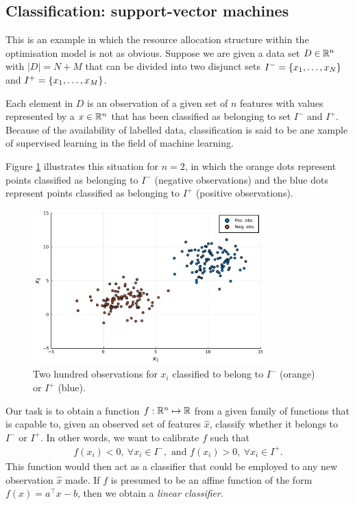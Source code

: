 \documentclass{article}
\begin{document}
\subsection{Classification: support-vector machines}

This is an example in which the resource allocation structure within the optimisation model is not as obvious. Suppose we are given a data set $D \in \mathbb R^{n}$ with $|D| = N + M$ that can be divided into two disjunct sets $I^- = \left\{ x_1, \dots, x_N \right \}$ and $I^+ = \left\{ x_1,\dots, x_M \right \}$. 

Each element in $D$ is an observation of a given set of $n$ features with values represented by a $x \in \mathbb R^n$ that has been classified as belonging to set $I^-$ and $I^+$. Because of the availability of labelled data, classification is said to be ane xample of supervised learning in the field of machine learning. 

Figure \ref{fig:classified_observations} illustrates this situation for $n = 2$, in which the orange dots represent points classified as belonging to $I^-$ (negative observations) and the blue dots represent points classified as belonging to $I^+$ (positive observations).

\begin{figure}
    \includegraphics[width=0.8\textwidth]{Figures/classes_no_classifier.pdf}
    \caption{Two hundred observations for $x_i$ classified to belong to $I^-$ (orange) or $I^+$ (blue).}        
    \label{fig:classified_observations}
\end{figure}

Our task is to obtain a function $f:\mathbb R^n \mapsto \mathbb R$ from a given family of functions that is capable to, given an observed set of features $\hat{x}$, classify whether it belongs to $I^-$ or $I^+$. In other words, we want to calibrate $f$ such that
%
\begin{align}
f(x_i) < 0, \ \forall x_i \in I^-, \text{ and } f(x_i) > 0, \ \forall x_i \in I^+.  
\end{align}
%
This function would then act as a classifier that could be employed to any new observation $\hat{x}$ made. If $f$ is presumed to be an affine function of the form $f(x) = a^\top x - b$, then we obtain a \emph{linear classifier}. 
\end{document}
